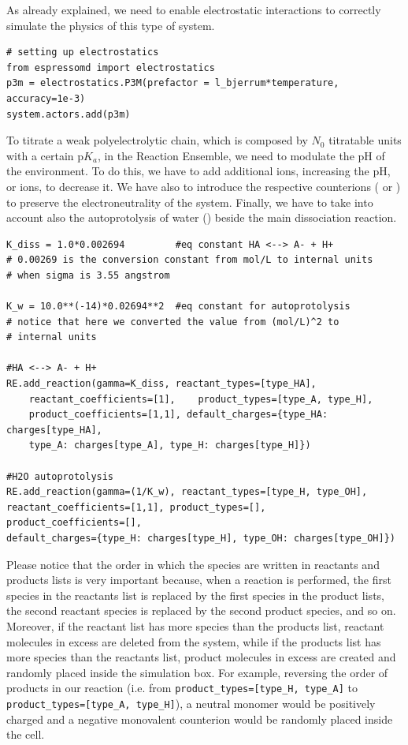 \documentclass[
a4paper,                        %
11pt,                           %
twoside,                        %
footsepline,                    %
headsepline,                    %
headexclude,                    %
footexclude,                    %
pagesize,                       %
]{scrartcl}
\begin{document}
As already explained, we need to enable electrostatic interactions to correctly simulate the physics of this type of system.
\begin{verbatim}
# setting up electrostatics
from espressomd import electrostatics
p3m = electrostatics.P3M(prefactor = l_bjerrum*temperature, accuracy=1e-3) 
system.actors.add(p3m)
\end{verbatim}
To titrate a weak polyelectrolytic chain, which is composed by $N_0$ titratable units with a certain $\text{p}K_a$, in the Reaction Ensemble, we need to modulate the pH of the environment. To do this, we have to add additional  ions, increasing the pH, or  ions, to decrease it. We have also to introduce the respective counterions ( or ) to preserve the electroneutrality of the system. Finally, we have to take into account also the autoprotolysis of water () beside the main dissociation reaction.

\begin{verbatim}
K_diss = 1.0*0.002694         #eq constant HA <--> A- + H+
# 0.00269 is the conversion constant from mol/L to internal units
# when sigma is 3.55 angstrom

K_w = 10.0**(-14)*0.02694**2  #eq constant for autoprotolysis
# notice that here we converted the value from (mol/L)^2 to 
# internal units 

#HA <--> A- + H+
RE.add_reaction(gamma=K_diss, reactant_types=[type_HA],
    reactant_coefficients=[1],    product_types=[type_A, type_H], 
    product_coefficients=[1,1], default_charges={type_HA: charges[type_HA], 
    type_A: charges[type_A], type_H: charges[type_H]})

#H2O autoprotolysis 
RE.add_reaction(gamma=(1/K_w), reactant_types=[type_H, type_OH], 
reactant_coefficients=[1,1], product_types=[],    product_coefficients=[],    
default_charges={type_H: charges[type_H], type_OH: charges[type_OH]})
\end{verbatim}
Please notice that the order in which the species are written in reactants and products lists is very important because, when a reaction is performed, the first species in the reactants list is replaced by the first species in the product lists, the second reactant species is replaced by the second product species, and so on. Moreover, if the reactant list has more species than the products list, reactant molecules in excess are deleted from the system, while if the products list has more species than the reactants list, product molecules in excess are created and randomly placed inside the simulation box. For example, reversing the order of products in our reaction (i.e. from  \verb|product_types=[type_H, type_A]| to \verb|product_types=[type_A, type_H]|), a neutral monomer would be positively charged and a negative monovalent counterion would be randomly placed inside the cell. 
\end{document}

